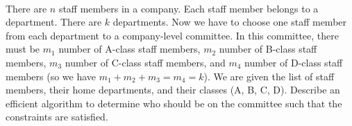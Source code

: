 \documentclass[a4paper]{article}
\begin{document}
\paragraph{}
There are $n$ staff members in a company. Each staff member belongs to a department. There are $k$
departments. Now we have to choose one staff member from each department to a company-level committee.
In this committee, there must be $m_{1}$ number of A-class staff members, $m_{2}$ number of B-class staff members,
$m_{3}$ number of C-class staff members, and $m_{4}$ number of D-class staff members (so we have $m_{1}+m_{2}+m_{3}=m_{4}=k$). We are given the list of staff members, their home departments, and their classes (A, B, C, D).
Describe an efficient algorithm to determine who should be on the committee such that the constraints are
satisfied.
\end{document}
